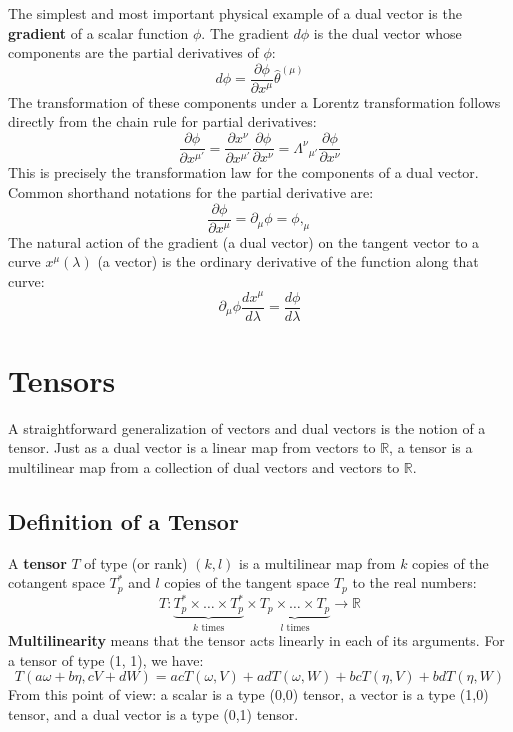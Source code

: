\documentclass[11pt, a4paper]{report}
\begin{document}
The simplest and most important physical example of a dual vector is the \textbf{gradient} of a scalar function $\phi$. The gradient $d\phi$ is the dual vector whose components are the partial derivatives of $\phi$:
\begin{equation}
    d\phi = \frac{\partial\phi}{\partial x^\mu} \hat{\theta}^{(\mu)}
\end{equation}
The transformation of these components under a Lorentz transformation follows directly from the chain rule for partial derivatives:
\begin{equation}
    \frac{\partial\phi}{\partial x^{\mu'}} = \frac{\partial x^\nu}{\partial x^{\mu'}} \frac{\partial\phi}{\partial x^\nu} = {\Lambda^\nu}_{\mu'} \frac{\partial\phi}{\partial x^\nu}
\end{equation}
This is precisely the transformation law for the components of a dual vector. Common shorthand notations for the partial derivative are:
\begin{equation}
    \frac{\partial\phi}{\partial x^\mu} = \partial_\mu \phi = \phi,_\mu
\end{equation}
The natural action of the gradient (a dual vector) on the tangent vector to a curve $x^\mu(\lambda)$ (a vector) is the ordinary derivative of the function along that curve:
\begin{equation}
    \partial_\mu\phi \frac{dx^\mu}{d\lambda} = \frac{d\phi}{d\lambda}
\end{equation}

\section{Tensors}

A straightforward generalization of vectors and dual vectors is the notion of a tensor. Just as a dual vector is a linear map from vectors to $\mathbb{R}$, a tensor is a multilinear map from a collection of dual vectors and vectors to $\mathbb{R}$.

\subsection*{Definition of a Tensor}

A \textbf{tensor} $T$ of type (or rank) $(k, l)$ is a multilinear map from $k$ copies of the cotangent space $T_p^*$ and $l$ copies of the tangent space $T_p$ to the real numbers:
\begin{equation}
    T: \underbrace{T_p^* \times \dots \times T_p^*}_{k \text{ times}} \times \underbrace{T_p \times \dots \times T_p}_{l \text{ times}} \to \mathbb{R}
\end{equation}
\textbf{Multilinearity} means that the tensor acts linearly in each of its arguments. For a tensor of type (1, 1), we have:
\begin{equation}
    T(a\omega + b\eta, cV + dW) = acT(\omega, V) + adT(\omega, W) + bcT(\eta, V) + bdT(\eta, W)
\end{equation}
From this point of view: a scalar is a type (0,0) tensor, a vector is a type (1,0) tensor, and a dual vector is a type (0,1) tensor.
\end{document}
